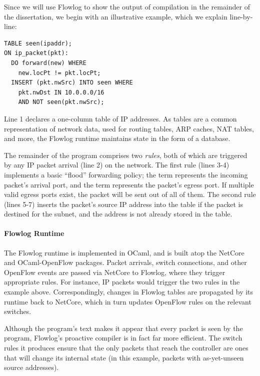 Since we will use Flowlog to show the output of compilation in the remainder of the
dissertation, we begin with an illustrative example, which we explain line-by-line:

\begin{lstlisting}[label=lst:flowlog-intro,language=Flowlog]
TABLE seen(ipaddr);
ON ip_packet(pkt):
  DO forward(new) WHERE
    new.locPt != pkt.locPt;
  INSERT (pkt.nwSrc) INTO seen WHERE
    pkt.nwDst IN 10.0.0.0/16 
    AND NOT seen(pkt.nwSrc);
\end{lstlisting}

\noindent
Line 1 declares a one-column table of IP addresses. As tables are a common
representation of network data, used for routing tables, ARP caches, NAT tables,
and more, the Flowlog runtime maintains state in the form of a database.

The remainder of the program comprises two \emph{rules}, both of which are
triggered by any IP packet arrival (line 2) on the network. The first rule (lines 3-4)
implements a basic ``flood'' forwarding policy; the  term
represents the incoming packet's arrival port, and the  term
represents the packet's egress port. If multiple valid egress ports exist, the
packet will be sent out of all of them. The second rule (lines 5-7) inserts the
packet's source IP address into the table if the packet is destined for the
 subnet, and the address is not already stored in the table.

\paragraph{Flowlog Runtime}

The Flowlog runtime is implemented in OCaml, and is built atop the
NetCore and OCaml-OpenFlow packages. Packet arrivals, switch
connections, and other OpenFlow events are passed via NetCore to
Flowlog, where they trigger appropriate rules. For instance, IP
packets would trigger the two rules in the example above.
Correspondingly, changes in Flowlog tables are propagated by its
runtime back to NetCore, which in turn updates OpenFlow rules on the
relevant switches.

Although the program's text makes it appear that every packet is seen by the
program, Flowlog's proactive compiler is in fact far more efficient. The
switch rules it produces ensure that the only packets that reach the controller are ones that will
change its internal state (in this example, packets with
as-yet-unseen source addresses).


